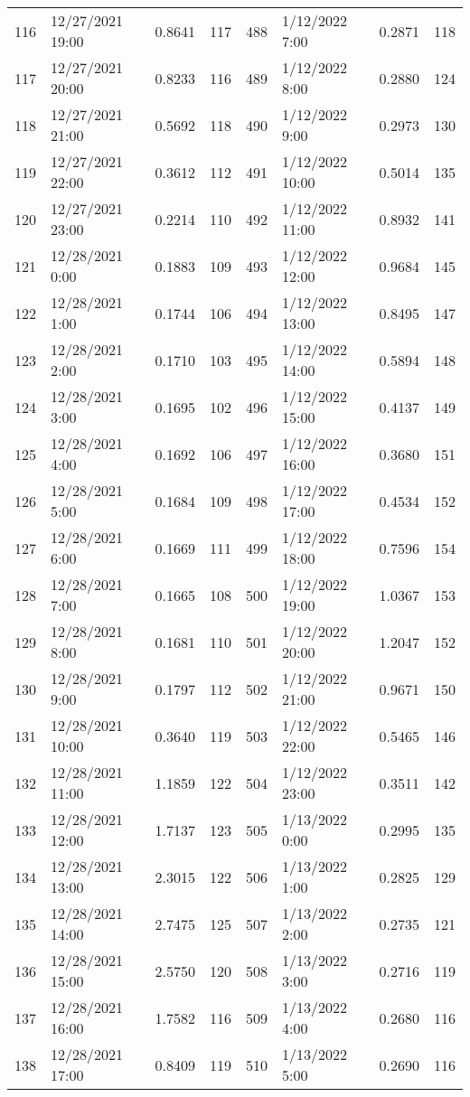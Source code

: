 \begin{center}
\begin{longtable}{llccllcc}
    116&12/27/2021 19:00&0.8641&117&488&1/12/2022 7:00	    &0.2871&118 \\
    117&12/27/2021 20:00&0.8233&116&489&1/12/2022 8:00	    &0.2880&124 \\
    118&12/27/2021 21:00&0.5692&118&490&1/12/2022 9:00	    &0.2973&130 \\
    119&12/27/2021 22:00&0.3612&112&491&1/12/2022 10:00	    &0.5014&135 \\
    120&12/27/2021 23:00&0.2214&110&492&1/12/2022 11:00	    &0.8932&141 \\
    121&12/28/2021 0:00	   &0.1883&109&493&1/12/2022 12:00	    &0.9684&145 \\
    122&12/28/2021 1:00	   &0.1744&106&494&1/12/2022 13:00	    &0.8495&147 \\
    123&12/28/2021 2:00	   &0.1710&103&495&1/12/2022 14:00	    &0.5894&148 \\
    124&12/28/2021 3:00	   &0.1695&102&496&1/12/2022 15:00	    &0.4137&149 \\
    125&12/28/2021 4:00	   &0.1692&106&497&1/12/2022 16:00	    &0.3680&151 \\
    126&12/28/2021 5:00	   &0.1684&109&498&1/12/2022 17:00	    &0.4534&152 \\
    127&12/28/2021 6:00	   &0.1669&111&499&1/12/2022 18:00	    &0.7596&154 \\
    128&12/28/2021 7:00	   &0.1665&108&500&1/12/2022 19:00	    &1.0367&153 \\
    129&12/28/2021 8:00	   &0.1681&110&501&1/12/2022 20:00	    &1.2047&152 \\
    130&12/28/2021 9:00	   &0.1797&112&502&1/12/2022 21:00	    &0.9671&150 \\
    131&12/28/2021 10:00&0.3640&119&503&1/12/2022 22:00	    &0.5465&146 \\
    132&12/28/2021 11:00&1.1859&122&504&1/12/2022 23:00	    &0.3511&142 \\
    133&12/28/2021 12:00&1.7137&123&505&1/13/2022 0:00	    &0.2995&135 \\
    134&12/28/2021 13:00&2.3015&122&506&1/13/2022 1:00	    &0.2825&129 \\
    135&12/28/2021 14:00&2.7475&125&507&1/13/2022 2:00	    &0.2735&121 \\
    136&12/28/2021 15:00&2.5750&120&508&1/13/2022 3:00	    &0.2716&119 \\
    137&12/28/2021 16:00&1.7582&116&509&1/13/2022 4:00	    &0.2680&116 \\
    138&12/28/2021 17:00&0.8409&119&510&1/13/2022 5:00	    &0.2690&116 \\

\end{longtable}
\end{center}
